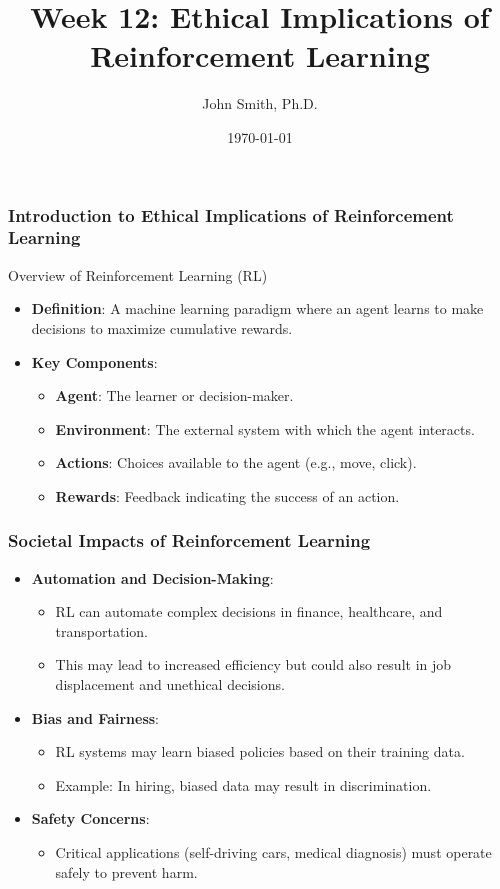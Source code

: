 \documentclass[aspectratio=169]{beamer}
\title[Week 12: Ethical Implications of Reinforcement Learning]{Week 12: Ethical Implications of Reinforcement Learning}
\author[J. Smith]{John Smith, Ph.D.}
\institute[University Name]{
  Department of Computer Science\\
  University Name\\
  \vspace{0.3cm}
  Email: email@university.edu\\
  Website: www.university.edu
}
\date{\today}
\begin{document}
\frame{\titlepage}

\begin{frame}[fragile]
    \frametitle{Introduction to Ethical Implications of Reinforcement Learning}
    \begin{block}{Overview of Reinforcement Learning (RL)}
        \begin{itemize}
            \item \textbf{Definition}: A machine learning paradigm where an agent learns to make decisions to maximize cumulative rewards.
            \item \textbf{Key Components}:
                \begin{itemize}
                    \item \textbf{Agent}: The learner or decision-maker.
                    \item \textbf{Environment}: The external system with which the agent interacts.
                    \item \textbf{Actions}: Choices available to the agent (e.g., move, click).
                    \item \textbf{Rewards}: Feedback indicating the success of an action.
                \end{itemize}
        \end{itemize}
    \end{block}
\end{frame}

\begin{frame}[fragile]
    \frametitle{Societal Impacts of Reinforcement Learning}
    \begin{itemize}
        \item \textbf{Automation and Decision-Making}: 
            \begin{itemize}
                \item RL can automate complex decisions in finance, healthcare, and transportation.
                \item This may lead to increased efficiency but could also result in job displacement and unethical decisions.
            \end{itemize}
        \item \textbf{Bias and Fairness}: 
            \begin{itemize}
                \item RL systems may learn biased policies based on their training data.
                \item Example: In hiring, biased data may result in discrimination.
            \end{itemize}
        \item \textbf{Safety Concerns}: 
            \begin{itemize}
                \item Critical applications (self-driving cars, medical diagnosis) must operate safely to prevent harm.
            \end{itemize}
    \end{itemize}
\end{frame}
\end{document}
